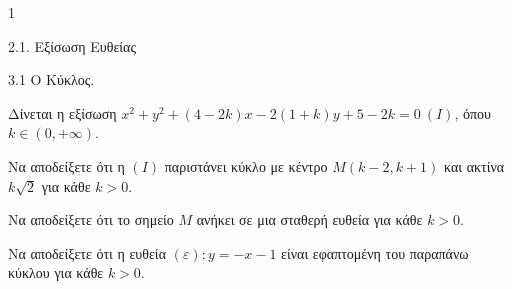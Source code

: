 \begin{ylh}{1}
    \item 2.1. Εξίσωση Ευθείας
    \item 3.1 Ο Κύκλος.
\end{ylh}
Δίνεται η εξίσωση $x^2 + y^2 + (4 - 2k)x - 2(1 + k)y + 5 - 2k = 0 \ (I)$, όπου $k \in (0, +\infty)$.
\begin{alist}
\item Να αποδείξετε ότι η $(I)$ παριστάνει κύκλο με κέντρο $M(k - 2, k + 1)$ και ακτίνα $k\sqrt{2}$ για κάθε $k > 0$. 
\item Να αποδείξετε ότι το σημείο $M$ ανήκει σε μια σταθερή ευθεία για κάθε $k > 0$. 
\item Να αποδείξετε ότι η ευθεία $(\varepsilon): y = -x - 1$ είναι εφαπτομένη του παραπάνω κύκλου για κάθε $k > 0$. 
\end{alist}